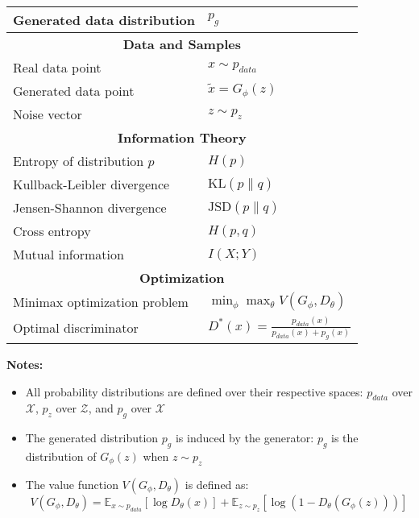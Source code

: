 \begin{center}
\begin{tabular}{@{}p{} p{}@{}}
		Generated data distribution                        & $p_g$                                               \\
		\midrule
		\multicolumn{2}{c}{\textbf{Data and Samples}}                                                            \\
		Real data point                                    & $x \sim p_{data}$                                   \\
		Generated data point                               & $\tilde{x} = G_\phi(z)$                             \\
		Noise vector                                       & $z \sim p_z$                                        \\
		\midrule
		\multicolumn{2}{c}{\textbf{Information Theory}}                                                          \\
		Entropy of distribution $p$                        & $H(p)$                                              \\
		Kullback-Leibler divergence                        & $\text{KL}(p \| q)$                                 \\
		Jensen-Shannon divergence                          & $\text{JSD}(p \| q)$                                \\
		Cross entropy                                      & $H(p, q)$                                           \\
		Mutual information                                 & $I(X; Y)$                                           \\
		\midrule
		\multicolumn{2}{c}{\textbf{Optimization}}                                                                \\
		Minimax optimization problem                       & $\min_{\phi} \max_{\theta} V(G_\phi, D_\theta)$     \\
		Optimal discriminator                              & $D^*(x) = \frac{p_{data}(x)}{p_{data}(x) + p_g(x)}$ \\
		\bottomrule
	\end{tabular}
\end{center}
\vspace{0.5cm}
\begin{center}
	\footnotesize
	\noindent\textbf{Notes:}
	\begin{itemize}
		\item All probability distributions are defined over their respective spaces: $p_{data}$ over $\mathcal{X}$, $p_z$ over $\mathcal{Z}$, and $p_g$ over $\mathcal{X}$
		\item The generated distribution $p_g$ is induced by the generator: $p_g$ is the distribution of $G_\phi(z)$ when $z \sim p_z$
		\item The value function $V(G_\phi, D_\theta)$ is defined as:
		      \[
			      V(G_\phi, D_\theta) = \mathbb{E}_{x \sim p_{data}}[\log D_\theta(x)] + \mathbb{E}_{z \sim p_z}[\log(1 - D_\theta(G_\phi(z)))]
		      \]
	\end{itemize}
\end{center}
